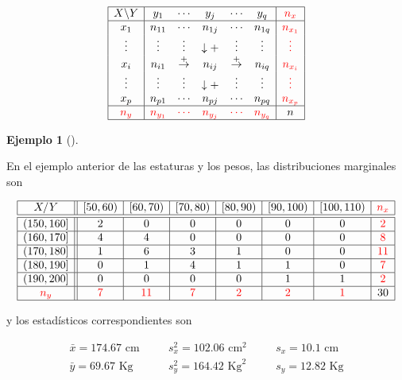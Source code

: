\documentclass[
  a4paper,
]{scrreport}
\theoremstyle{plain}
\theoremstyle{definition}
\theoremstyle{definition}
\newtheorem{example}{Ejemplo}[chapter]
\theoremstyle{remark}
\begin{document}
\[
\begin{array}{|c|ccccc|c|}
\hline
X\backslash Y & y_1 & \cdots & y_j & \cdots & y_q & \color{red}{n_x}\\
\hline
x_1 & n_{11} & \cdots & n_{1j} & \cdots & n_{1q} & \color{red}{n_{x_1}}\\
\vdots & \vdots & \vdots & \downarrow + & \vdots & \vdots & \color{red}{\vdots} \\
x_i & n_{i1} & \stackrel{+}{\rightarrow} & n_{ij} & \stackrel{+}{\rightarrow} & n_{iq} & \color{red}{n_{x_i}}\\
\vdots & \vdots & \vdots & \downarrow +  & \vdots & \vdots & \color{red}{\vdots}\\
x_p & n_{p1} & \cdots & n_{pj} & \cdots & n_{pq} & \color{red}{n_{x_p}} \\
\hline
\color{red}{n_y} & \color{red}{n_{y_1}} & \color{red}{\cdots} & \color{red}{n_{y_j}} & \color{red}{\cdots} & \color{red}{n_{y_q}} & n\\
\hline
\end{array}
\]

\begin{example}[]\protect\hypertarget{exm-distribuciones-marginales}{}\label{exm-distribuciones-marginales}

En el ejemplo anterior de las estaturas y los pesos, las distribuciones
marginales son

\[
\begin{array}{|c||c|c|c|c|c|c|c|}
\hline
  X/Y & [50,60) & [60,70) & [70,80) & [80,90) & [90,100) & [100,110) & \color{red}{n_x}\\
  \hline\hline
  (150,160] & 2 & 0 & 0 & 0 & 0 & 0 & \color{red}{2}\\
  \hline
  (160,170] & 4 & 4 & 0 & 0 & 0 & 0 & \color{red}{8}\\
  \hline
  (170,180] & 1 & 6 & 3 & 1 & 0 & 0 & \color{red}{11} \\
  \hline
  (180,190] & 0 & 1 & 4 & 1 & 1 & 0 & \color{red}{7} \\
  \hline
  (190,200] & 0 & 0 & 0 & 0 & 1 & 1 & \color{red}{2}\\
  \hline
  \color{red}{n_y} & \color{red}{7} & \color{red}{11} & \color{red}{7} & \color{red}{2} & \color{red}{2} & \color{red}{1} & 30\\
  \hline
\end{array}
\]

y los estadísticos correspondientes son

\[
\begin{array}{lllll}
\bar x = 174.67 \mbox{ cm} & \quad & s^2_x = 102.06 \mbox{ cm}^2 & \quad & s_x = 10.1 \mbox{ cm}\\
\bar y = 69.67 \mbox{ Kg} & & s^2_y = 164.42 \mbox{ Kg}^2 & & s_y = 12.82 \mbox{ Kg}
\end{array}
\]

\end{example}
\end{document}
